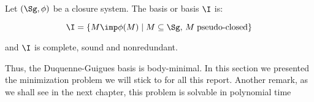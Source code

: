 \begin{definition} Let $(\Sg, \phi)$ be a 
closure system. The  basis or  
basis $\I$ is:

	\[ \I = \{ M \imp \phi(M) \; | \; M \subseteq \Sg, \, M \;
		\text{pseudo-closed} \} \]

\noindent and $\I$ is complete, sound and nonredundant.
\end{definition}

\noindent Thus, the Duquenne-Guigues basis is body-minimal. In this section 
we presented the minimization problem we will stick to for all this report. 
Another remark, as we shall see in the next chapter, this problem is solvable
in polynomial time
